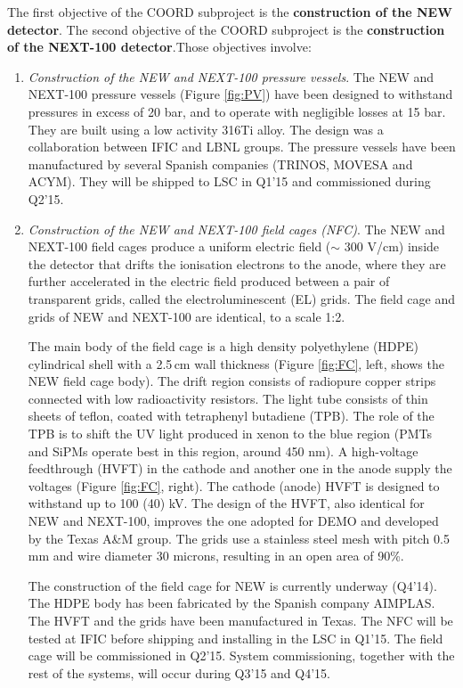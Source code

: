 The first objective of the COORD subproject is the {\bf construction of the NEW detector}. The second  objective of the COORD subproject is the {\bf construction of the NEXT-100 detector}.Those objectives involve:

\begin{enumerate}
\item {\em Construction of the NEW and NEXT-100 pressure vessels}.
The NEW and NEXT-100 pressure vessels (Figure \ref{fig:PV}) have been designed to withstand pressures in excess of 20 bar, and to operate with negligible losses at 15 bar. They are built using a low activity 316Ti alloy. The design was a collaboration between IFIC and LBNL groups. The pressure vessels have been manufactured by several Spanish companies (TRINOS, MOVESA and ACYM). They will be shipped to LSC in Q1'15 and commissioned during Q2'15. 

\item {\em Construction of the NEW and NEXT-100 field cages (NFC)}.
The NEW and NEXT-100 field cages produce a uniform electric field ($\sim$ 300 V/cm) inside the  detector that drifts the ionisation electrons to the anode, where they are further accelerated in the electric field produced between a pair of transparent grids, called the electroluminescent (EL) grids. The field cage and grids of NEW and NEXT-100 are identical, to a scale 1:2.

The main body of the field cage is a high density polyethylene (HDPE) cylindrical shell with a 2.5\,cm wall thickness (Figure \ref{fig:FC}, left, shows the NEW field cage body).  The drift region consists of radiopure  copper strips connected with low radioactivity resistors.  The light tube consists of thin sheets of teflon, coated with tetraphenyl butadiene (TPB). The role of the TPB is to shift the UV light produced in xenon to the blue region (PMTs and SiPMs operate best in this region, around 450 nm).  A high-voltage feedthrough (HVFT) in the cathode and another one in the anode supply the voltages (Figure \ref{fig:FC}, right). The cathode (anode) HVFT is designed to withstand up to 100 (40) kV. The design of the HVFT, also identical for NEW and NEXT-100, improves the one adopted for DEMO and developed by the Texas A\&M group. The grids use a stainless steel mesh with pitch 0.5 mm and wire diameter 30 microns, resulting in an open area of 90\%. 

The construction of the field cage for NEW is currently underway (Q4'14). The HDPE body has been fabricated by the Spanish company AIMPLAS. The HVFT and the grids have been manufactured in Texas. The NFC will be tested at IFIC before shipping and installing in the LSC in Q1'15. The field cage will be commissioned in Q2'15. System commissioning, together with the rest of the systems, will occur during Q3'15 and Q4'15.


\end{enumerate}
